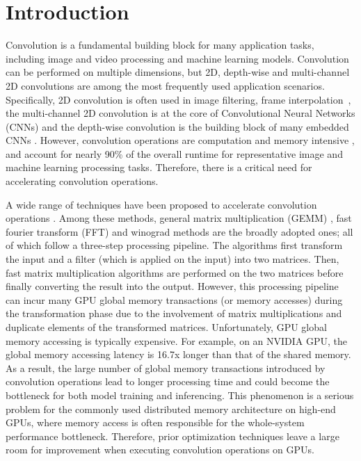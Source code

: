 \section{Introduction}
Convolution is a fundamental building block for many application tasks, including image and video processing and machine learning models.
Convolution can be performed on multiple dimensions, but 2D, depth-wise and multi-channel 2D convolutions are among the most frequently used application
scenarios. Specifically, 2D convolution is often used in image filtering, frame
interpolation~\cite{Perrot2014Fine,Ma2014Optimized,Rudi2015Image,Niklaus2017Video},  the multi-channel 2D convolution is at the core of Convolutional Neural Networks (CNNs)
\cite{Krizhevsky2012ImageNet,SimonyanZ14a,HeZRS16,SzegedyLJSRAEVR15} and the depth-wise convolution is the building block of many embedded CNNs
\cite{Sandler_2018_CVPR,Ma_2018_ECCV,tan2019efficientnet}. However, convolution operations are computation and memory intensive
\cite{cavigelli2015accelerating}, and account for nearly 90\% of the overall runtime \cite{Li2016Performance} for representative image and
machine learning processing tasks. Therefore, there is a critical need for accelerating convolution operations.



A wide range of techniques have been proposed to accelerate convolution operations
\cite{Iandola2014Communication,vasilache2014fast,lavin2016fast,cho2017mec,Zhen2018Optimizing,Vasudevan2017Parallel,Chellapilla2006High,zhang2015dwarfcode}.
Among these methods, general matrix multiplication (GEMM) \cite{Vasudevan2017Parallel,Chellapilla2006High}, fast fourier transform (FFT)
\cite{vasilache2014fast} and winograd \cite{lavin2016fast} methods are the broadly adopted ones;  all of which follow a three-step
processing pipeline. The algorithms first transform the input and a filter (which is applied on the input) into two matrices. Then, fast
matrix multiplication algorithms \cite{karstadt2017matrix,scott2015matrix} are performed on the two matrices before finally converting the
result into the output. However, this processing pipeline can incur many GPU global memory transactions (or
memory accesses) during the transformation phase due to the involvement of matrix multiplications and duplicate elements of the transformed
matrices. Unfortunately, GPU global memory accessing is typically expensive. For example, on an NVIDIA GPU, the global memory accessing
latency is 16.7x longer than that of the shared memory. As a result, the large number of global memory transactions introduced by
convolution operations lead to longer processing time and could become the bottleneck for both model training and inferencing.  This
phenomenon is a serious problem for the commonly used distributed memory architecture on high-end GPUs, where memory access is often
responsible for the whole-system performance bottleneck. Therefore, prior optimization techniques leave a large room for improvement when
executing convolution operations on GPUs.



